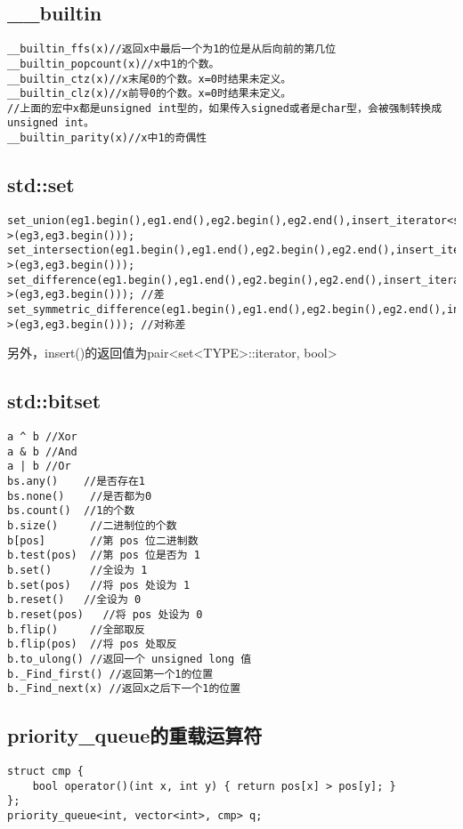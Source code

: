 \documentclass[twocolumn,a4]{article}
\begin{document}
\subsection{\_\_builtin}
\begin{lstlisting}
__builtin_ffs(x)//返回x中最后一个为1的位是从后向前的第几位
__builtin_popcount(x)//x中1的个数。
__builtin_ctz(x)//x末尾0的个数。x=0时结果未定义。
__builtin_clz(x)//x前导0的个数。x=0时结果未定义。
//上面的宏中x都是unsigned int型的，如果传入signed或者是char型，会被强制转换成unsigned int。
__builtin_parity(x)//x中1的奇偶性
\end{lstlisting}
\subsection{std::set}
\begin{lstlisting}
set_union(eg1.begin(),eg1.end(),eg2.begin(),eg2.end(),insert_iterator<set<int> >(eg3,eg3.begin()));
set_intersection(eg1.begin(),eg1.end(),eg2.begin(),eg2.end(),insert_iterator<set<int> >(eg3,eg3.begin()));
set_difference(eg1.begin(),eg1.end(),eg2.begin(),eg2.end(),insert_iterator<set<int> >(eg3,eg3.begin())); //差
set_symmetric_difference(eg1.begin(),eg1.end(),eg2.begin(),eg2.end(),insert_iterator<set<int> >(eg3,eg3.begin())); //对称差
\end{lstlisting}
另外，insert()的返回值为pair<set<TYPE>::iterator, bool>
\subsection{std::bitset}
\begin{lstlisting}
a ^ b //Xor
a & b //And
a | b //Or
bs.any()    //是否存在1
bs.none()    //是否都为0
bs.count()  //1的个数
b.size()     //二进制位的个数
b[pos]       //第 pos 位二进制数
b.test(pos)  //第 pos 位是否为 1
b.set()      //全设为 1
b.set(pos)   //将 pos 处设为 1
b.reset()   //全设为 0
b.reset(pos)   //将 pos 处设为 0
b.flip()     //全部取反
b.flip(pos)  //将 pos 处取反
b.to_ulong() //返回一个 unsigned long 值
b._Find_first() //返回第一个1的位置
b._Find_next(x) //返回x之后下一个1的位置
\end{lstlisting}
\subsection{priority\_queue的重载运算符}
\begin{lstlisting}
struct cmp {
	bool operator()(int x, int y) { return pos[x] > pos[y]; }
};
priority_queue<int, vector<int>, cmp> q;
\end{lstlisting}
\end{document}
